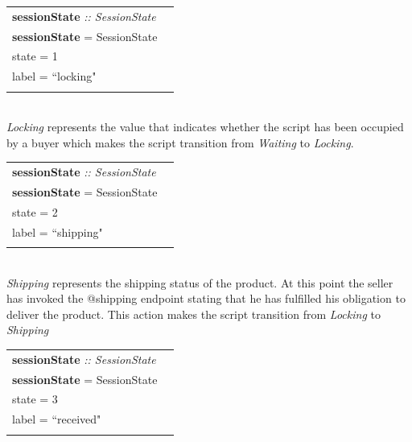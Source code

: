 \documentclass[12pt]{article}
\begin{document}
\begin{tabular}{lr}
\textbf{sessionState} \emph{:: SessionState}\\
\textbf{sessionState}  = SessionState  \textbraceleft{}
\\ \hspace{54mm}state = 1
\\ \hspace{54mm}label = ``locking"
\\\hspace{51mm}\textbraceright{} 
\end{tabular}
\\

 \emph{Locking} represents the value that indicates whether the script has been occupied by a buyer which makes the script transition from \emph{Waiting} to \emph{Locking}.
\\

\begin{tabular}{lr}
\textbf{sessionState} \emph{:: SessionState}\\
\textbf{sessionState}  = SessionState  \textbraceleft{}
\\ \hspace{54mm}state = 2
\\ \hspace{54mm}label = ``shipping"
\\\hspace{51mm}\textbraceright{} 
\end{tabular}
\\

\emph{Shipping} represents the shipping status of the product. 
At this point the seller has invoked the @shipping endpoint stating that he has fulfilled his obligation to deliver the product. This action makes the script transition from \emph{Locking} to \emph{Shipping}
\\

\begin{tabular}{lr}
\textbf{sessionState} \emph{:: SessionState}\\
\textbf{sessionState}  = SessionState  \textbraceleft{}
\\ \hspace{54mm}state = 3
\\ \hspace{54mm}label = ``received"
\\\hspace{51mm}\textbraceright{} 
\end{tabular}
\\
\end{document}
